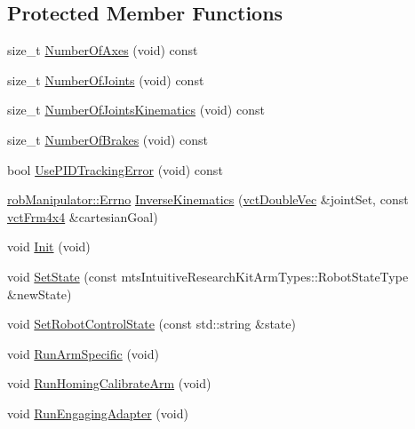 \subsection*{Protected Member Functions}
\begin{DoxyCompactItemize}
\item 
size\-\_\-t \hyperlink{classmts_intuitive_research_kit_p_s_m_aed9503acb416c319c5d3b7e016dc28d9}{Number\-Of\-Axes} (void) const 
\item 
size\-\_\-t \hyperlink{classmts_intuitive_research_kit_p_s_m_a658ddc12e7550eba51f7752a071fdec8}{Number\-Of\-Joints} (void) const 
\item 
size\-\_\-t \hyperlink{classmts_intuitive_research_kit_p_s_m_a00fe92e880c15b2cdb7254c23a02ffd9}{Number\-Of\-Joints\-Kinematics} (void) const 
\item 
size\-\_\-t \hyperlink{classmts_intuitive_research_kit_p_s_m_ac1e54884506cb71ebd758705505bcd04}{Number\-Of\-Brakes} (void) const 
\item 
bool \hyperlink{classmts_intuitive_research_kit_p_s_m_aafcc1c6ba32a21cccd3c575130c4844a}{Use\-P\-I\-D\-Tracking\-Error} (void) const 
\item 
\hyperlink{classrob_manipulator_a7bbb51cdb81c9c681075a9274ca0cdc0}{rob\-Manipulator\-::\-Errno} \hyperlink{classmts_intuitive_research_kit_p_s_m_a6845c1c1142cec4f91b649acbc6ac60d}{Inverse\-Kinematics} (\hyperlink{vct_dynamic_vector_types_8h_ade4b3068c86fb88f41af2e5187e491c2}{vct\-Double\-Vec} \&joint\-Set, const \hyperlink{vct_transformation_types_8h_a33da47f4deb2556b37a69a2c44b29d75}{vct\-Frm4x4} \&cartesian\-Goal)
\item 
void \hyperlink{classmts_intuitive_research_kit_p_s_m_aedd95487ba1a9f92188b628b8d6cc6f2}{Init} (void)
\item 
void \hyperlink{classmts_intuitive_research_kit_p_s_m_a0149b1fd141ad034d0e2169859a003bf}{Set\-State} (const mts\-Intuitive\-Research\-Kit\-Arm\-Types\-::\-Robot\-State\-Type \&new\-State)
\item 
void \hyperlink{classmts_intuitive_research_kit_p_s_m_a8e0988ba33c89dd6cf9f4a02daa25820}{Set\-Robot\-Control\-State} (const std\-::string \&state)
\item 
void \hyperlink{classmts_intuitive_research_kit_p_s_m_a342233d48e38ff7d1141e7e8412b9d2a}{Run\-Arm\-Specific} (void)
\item 
void \hyperlink{classmts_intuitive_research_kit_p_s_m_a78cb115da7d404effea18992c1514222}{Run\-Homing\-Calibrate\-Arm} (void)
\item 
void \hyperlink{classmts_intuitive_research_kit_p_s_m_adca90ab2aaf26196a0826a3ab877c471}{Run\-Engaging\-Adapter} (void)

\end{DoxyCompactItemize}
